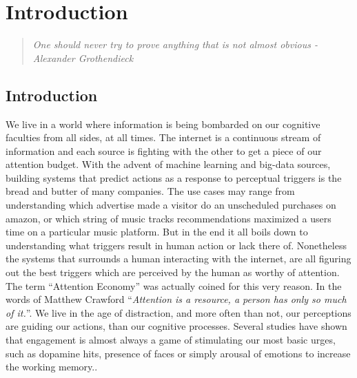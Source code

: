 
\chapter{Introduction}  %

\graphicspath{{Chapter1/Figures/} {Chapter1/Figures}}
\begin{quote}
\textsl{One should never try to prove anything that is not almost obvious - Alexander Grothendieck}
\end{quote}


\section{Introduction}

We live in a world where information is being bombarded on our cognitive faculties from all sides, at all times. The internet is a continuous stream of information and each source is fighting with the other to get a piece of our attention budget. 
With the advent of machine learning and big-data sources, building systems that predict actions as a response to perceptual triggers is the bread and butter of many companies. The use cases may range from understanding which advertise made a visitor do an unscheduled purchases on amazon, or which string of music tracks recommendations maximized a users time on a particular music platform. But in the end it all boils down to understanding what triggers result in human action or lack there of\cite{song2012survey}. Nonetheless the systems that surrounds a human interacting with the internet, are all figuring out the best triggers which are perceived by the human as worthy of attention. 
The term ``Attention Economy''\cite{davenport2001attention} was actually coined for this very reason. In the words of Matthew Crawford ``\textit{Attention is a resource, a person has only so much of it.}''\cite{MatthewCrawford}. We live in the age of distraction, and more often than not, our perceptions are guiding our actions, than our cognitive processes. Several studies have shown that engagement is almost always a game of stimulating our most basic urges, such as dopamine hits, presence of faces or simply arousal of emotions to increase the working memory.\cite{bakhshi2014faces,joglekar2017like}\cite{schupp2006emotion}\cite{soat2015social}. 


